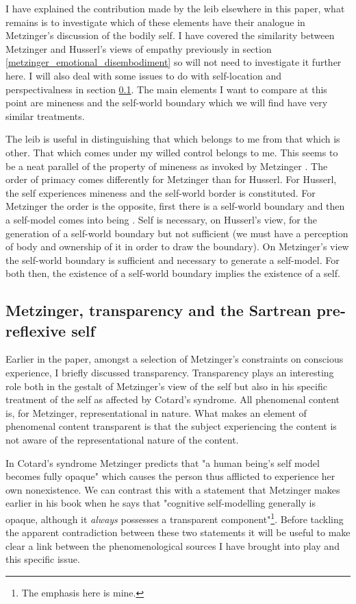 I have explained the contribution made by the leib elsewhere in this paper, what remains is to investigate which of these elements have their analogue in Metzinger's discussion of the bodily self. I have covered the similarity between Metzinger and Husserl's views of empathy previously in section \ref{metzinger_emotional_disembodiment} so will not need to investigate it further here. I will also deal with some issues to do with self-location and perspectivalness in section \ref{metzinger_self_sartre}. The main elements I want to compare at this point are mineness and the self-world boundary which we will find have very similar treatments.

The leib is useful in distinguishing that which belongs to me from that which is other. That which comes under my willed control belongs to me. This seems to be a neat parallel of the property of mineness as invoked by Metzinger \cite[p. 302]{metzinger2003}. The order of primacy comes differently for Metzinger than for Husserl. For Husserl, the self experiences mineness and the self-world border is constituted. For Metzinger the order is the opposite, first there is a self-world boundary and then a self-model comes into being \cite[p. 313]{metzinger2003}. Self is necessary, on Husserl's view, for the generation of a self-world boundary but not sufficient (we must have a perception of body and ownership of it in order to draw the boundary). On Metzinger's view the self-world boundary is sufficient and necessary \cite[pp. 307, 313]{metzinger2003} to generate a self-model. For both then, the existence of a self-world boundary implies the existence of a self.

\subsection{Metzinger, transparency and the Sartrean pre-reflexive self}
\label{metzinger_self_sartre}

Earlier in the paper, amongst a selection of Metzinger's constraints on conscious experience, I briefly discussed transparency. Transparency plays an interesting role both in the gestalt of Metzinger's view of the self but also in his specific treatment of the self as affected by Cotard's syndrome. All phenomenal content is, for Metzinger, representational in nature. What makes an element of phenomenal content transparent is that the subject experiencing the content is not aware of the representational nature of the content. 

In Cotard's syndrome Metzinger predicts that "a human being's self model becomes fully opaque" \cite[p. 460]{metzinger2003} which causes the person thus afflicted to experience her own nonexistence. We can contrast this with a statement that Metzinger makes earlier in his book when he says that "cognitive self-modelling generally is opaque, although it \emph{always} possesses a transparent component"\footnote{The emphasis here is mine.}. Before tackling the apparent contradiction between these two statements it will be useful to make clear a link between the phenomenological sources I have brought into play and this specific issue.

